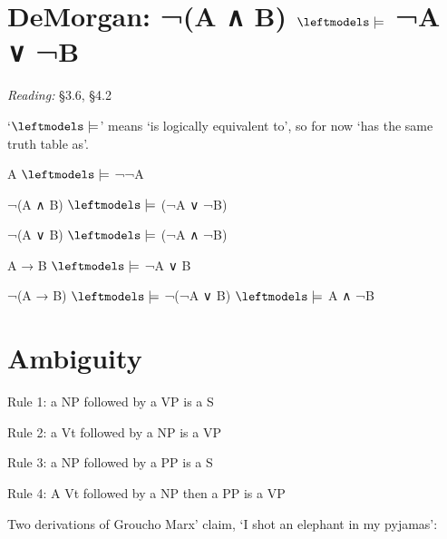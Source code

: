 \documentclass[12pt]{extarticle}
\begin{document}
\begin{multicols*}{3}
 
\section{DeMorgan: ¬(A ∧ B) $\leftmodels\models$ ¬A ∨ ¬B}
 
\emph{Reading:} §3.6, §4.2
 
`$\leftmodels\models$' means `is logically equivalent to', so for now `has the same truth table as'.
 
A $\leftmodels\models$ ¬¬A
 
¬(A ∧ B) $\leftmodels\models$ (¬A ∨ ¬B)
 
¬(A ∨ B) $\leftmodels\models$ (¬A ∧ ¬B)
 
A → B $\leftmodels\models$ ¬A ∨ B
 
¬(A → B) $\leftmodels\models$ ¬(¬A ∨ B) $\leftmodels\models$ A ∧ ¬B
 


\section{Ambiguity}
 
Rule 1: a NP followed by a VP is a S
 
Rule 2: a Vt followed by a NP is a VP
 
Rule 3: a NP followed by a PP is a S
 
Rule 4: A Vt followed by a NP then a PP is a VP
 
Two derivations of Groucho Marx’ claim, ‘I shot an elephant in my pyjamas':
 

\end{multicols*}
\end{document}
